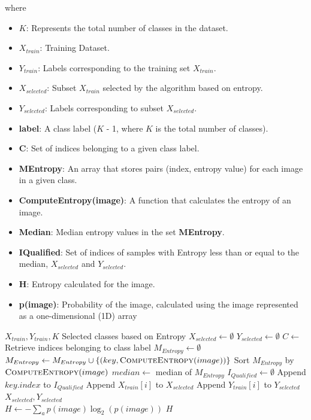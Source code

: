 \documentclass[11pt,a4paper]{article}
\begin{document}
where
\begin{itemize}
  \item $K$: Represents the total number of classes in the dataset.
  \item $X_{train}$: Training Dataset.
  \item $Y_{train}$: Labels corresponding to the training set $X_{train}$.
  \item $X_{selected}$: Subset $X_{train}$ selected by the algorithm based on entropy.
  \item $Y_{selected}$: Labels corresponding to subset $X_{selected}$.
  \item \textbf{label}: A class label ($K$ - 1, where $K$ is the total number of classes).
  \item \textbf{C}: Set of indices belonging to a given class label.
  \item \textbf{MEntropy}: An array that stores pairs (index, entropy value) for each image in a given class.
  \item \textbf{ComputeEntropy(image)}: A function that calculates the entropy of an image.
  \item \textbf{Median}: Median entropy values in the set \textbf{MEntropy}.
  \item \textbf{IQualified}: Set of indices of samples with Entropy less than or equal to the median, $X_{selected}$ and $Y_{selected}$.
  \item \textbf{H}: Entropy calculated for the image.
  \item \textbf{p(image)}: Probability of the image, calculated using the image represented as a one-dimensional (1D) array
\end{itemize}

\begin{algorithm}[H]
\label{alg:enbase}
\caption{EnBaSe. Where $K$ Denotes the Total Number of Classes}
\begin{algorithmic}[1]
\Require $X_{train}, Y_{train}, K$
\Ensure Selected classes based on Entropy
\State $X_{selected} \gets \emptyset$
\State $Y_{selected} \gets \emptyset$
  \State $C \gets$ Retrieve indices belonging to class label
  \State $M_{Entropy} \gets \emptyset$
    \State $M_{Entropy} \gets M_{Entropy} \cup \{(key, \Call{ComputeEntropy}{image})\}$
  \EndFor
  \State Sort $M_{Entropy}$ by $\Call{ComputeEntropy}{image}$
  \State $median \gets$ median of $M_{Entropy}$
  \State $I_{Qualified} \gets \emptyset$
      \State Append $key.index$ to $I_{Qualified}$
    \EndIf
  \EndFor
    \State Append $X_{train}[i]$ to $X_{selected}$
    \State Append $Y_{train}[i]$ to $Y_{selected}$
  \EndFor
\EndFor
\State \Return $X_{selected}, Y_{selected}$
\\
  \State $H \gets -\sum_{a} p(image)\log_{2}(p(image))$
  \State \Return $H$
\EndFunction
\end{algorithmic}
\end{algorithm}
\end{document}
